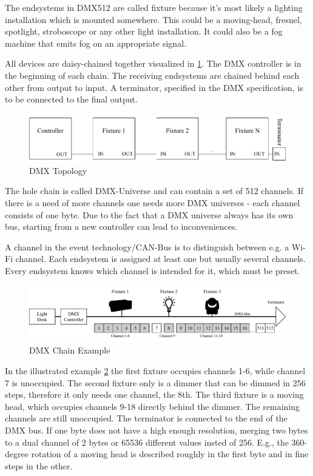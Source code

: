 The endsystems in DMX512 are called fixture because it's most likely a lighting installation which is mounted somewhere.
This could be a moving-head, fresnel, spotlight, stroboscope or any other light installation.
It could also be a fog machine that emits fog on an appropriate signal.

All devices are daisy-chained together visualized in \ref{fig:dmx_diagram}.
The DMX controller is in the beginning of each chain.
The receiving endsystems are chained behind each other from output to input. 
A terminator, specified in the DMX specification, is to be connected to the final output.
 

\begin{figure}[h]
	\centering
	\includegraphics[scale=0.6]{figures/DMX_blockdiagram.pdf}
	\caption{DMX Topology}
	\label{fig:dmx_diagram}
\end{figure}

The hole chain is called DMX-Universe and can contain a set of 512 channels.
If there is a need of more channels one needs more DMX universes - each channel consists of one byte.
Due to the fact that a DMX universe always has its own bus, starting from a new controller can lead to inconveniences.

A channel in the event technology/CAN-Bus is to distinguish between e.g. a Wi-Fi channel.
Each endsystem is assigned at least one but usually several channels.
Every endsystem knows which channel is intended for it, which must be preset.

\begin{figure}[h]
	\centering
	\includegraphics[scale=0.6]{figures/DMX_Chain.pdf}
	\caption{DMX Chain Example}
	\label{fig:dmx_chain}
\end{figure}

In the illustrated example \cref{fig:dmx_chain} the first fixture occupies channels 1-6, while channel 7 is unoccupied.
The second fixture only is a dimmer that can be dimmed in 256 steps, therefore it only needs one channel, the 8th.
The third fixture is a moving head, which occupies channels 9-18 directly behind the dimmer.
The remaining channels are still unoccupied.
The terminator is connected to the end of the DMX bus.
If one byte does not have a high enough resolution, 
merging two bytes to a dual channel of 2 bytes or 65536 different values insted of 256.
E.g., the 360-degree rotation of a moving head is described roughly in the first byte and in fine steps in the other.

